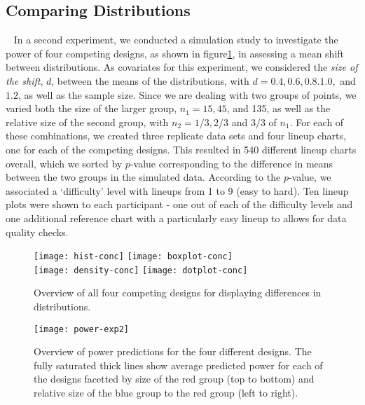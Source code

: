\subsection{Comparing Distributions}~\label{experimenttwo}
In a second experiment, we conducted a simulation study to investigate the power of four competing designs, as shown in figure\ref{fig:expii}, in assessing a mean shift between distributions. As covariates for this experiment, we considered the {\it size of the shift}, $d$, between the means of the distributions, with $d=0.4, 0.6, 0.8. 1.0,$ and $1.2$, as well as the sample size.  Since we are dealing with two groups of points, we varied both the size of the larger group, $n_1 = 15, 45$, and 135, as well as the relative size of the second group, with $n_2 = 1/3, 2/3$ and $3/3$ of $n_1$. For each of these combinations, we created three replicate data sets and four lineup charts, one for each of the competing designs. This resulted in 540 different lineup charts overall, which we sorted by $p$-value corresponding to the difference in means between the two groups in the simulated data. According to the $p$-value, we associated a `difficulty' level with lineups from 1 to 9 (easy to hard). Ten lineup plots were shown to each participant - one out of each of the difficulty levels and one additional reference chart with a particularly easy lineup  to allows for data quality checks.
\begin{figure} [hbtp]
   \centering
   \texttt{[image: hist-conc]} 
   \texttt{[image: boxplot-conc]} \\
   \texttt{[image: density-conc]} 
   \texttt{[image: dotplot-conc]} 
   \caption{Overview of all four competing designs for displaying differences in distributions.}
   \label{fig:expii}
\end{figure}

\begin{figure*}[htbp] %
   \centering
   \texttt{[image: power-exp2]} 
   \caption{Overview of power predictions for the four different designs. The fully saturated thick lines show average predicted power for each of the designs facetted by size of the red group (top to bottom) and relative size of the blue group to the red group (left to right). }
   \label{fig:power2}
\end{figure*}

